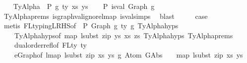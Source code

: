 \begin{isabellebody}
\isamarkupfalse%
\isanewline
\ \ \isamarkupfalse%
\ {\isacharparenleft}{\kern0pt}TyAlpha\ {\isasymGamma}{}\ P\ g\ ty\ xs\ ys{\isacharparenright}{\kern0pt}\isanewline
\ \ \isamarkupfalse%
\ P{}{\isacharcolon}{\kern0pt}\ {\isachardoublequoteopen}is{\isacharunderscore}{\kern0pt}val\ {\isacharparenleft}{\kern0pt}Graph\ g{\isacharparenright}{\kern0pt}{\isachardoublequoteclose}\isanewline
\ \ \ \ \isamarkupfalse%
\ TyAlpha{\isachardot}{\kern0pt}prems{\isacharparenleft}{\kern0pt}{}{\isacharparenright}{\kern0pt}\ is{\isacharunderscore}{\kern0pt}graph{\isacharunderscore}{\kern0pt}val{\isacharunderscore}{\kern0pt}ignore{\isacharunderscore}{\kern0pt}lmap\ is{\isacharunderscore}{\kern0pt}val{\isachardot}{\kern0pt}simps{\isacharparenleft}{\kern0pt}{}{\isacharparenright}{\kern0pt}\ \isamarkupfalse%
\ blast\isanewline
\ \ \isamarkupfalse%
\ \isamarkupfalse%
\ {\isacharquery}{\kern0pt}case\isanewline
\ \ \isamarkupfalse%
\ {\isacharparenleft}{\kern0pt}metis\ FL{\isacharunderscore}{\kern0pt}typing{\isacharunderscore}{\kern0pt}LRHS{\isacharbrackleft}{\kern0pt}of\ {\isasymGamma}{}\ P\ {\isachardoublequoteopen}Graph\ g{\isachardoublequoteclose}\ ty\ g{\isacharbrackright}{\kern0pt}\ TyAlpha{\isachardot}{\kern0pt}hyps{\isacharparenleft}{\kern0pt}{}{\isacharparenright}{\kern0pt}\isanewline
\ \ \ \ TyAlpha{\isachardot}{\kern0pt}hyps{\isacharparenleft}{\kern0pt}{}{\isacharparenright}{\kern0pt}{\isacharbrackleft}{\kern0pt}of\ {\isachardoublequoteopen}map\ {\isacharparenleft}{\kern0pt}lsubst\ {\isacharparenleft}{\kern0pt}zip\ ys\ xs{\isacharparenright}{\kern0pt}{\isacharparenright}{\kern0pt}\ zs{\isachardoublequoteclose}{\isacharbrackright}{\kern0pt}\ TyAlpha{\isachardot}{\kern0pt}hyps{\isacharparenleft}{\kern0pt}{}{\isacharcomma}{\kern0pt}{}{\isacharcomma}{\kern0pt}{}{\isacharcomma}{\kern0pt}{}{\isacharparenright}{\kern0pt}\ TyAlpha{\isachardot}{\kern0pt}prems{\isacharparenleft}{\kern0pt}{}{\isacharcomma}{\kern0pt}{}{\isacharparenright}{\kern0pt}\isanewline
\ \ \ \ dual{\isacharunderscore}{\kern0pt}order{\isachardot}{\kern0pt}refl{\isacharbrackleft}{\kern0pt}of\ {\isachardoublequoteopen}FLty\ ty{\isachardoublequoteclose}{\isacharbrackright}{\kern0pt}\isanewline
\ \ \ \ e{\isacharunderscore}{\kern0pt}Graph{\isacharbrackleft}{\kern0pt}of\ {\isachardoublequoteopen}lmap\ {\isacharparenleft}{\kern0pt}lsubst\ {\isacharparenleft}{\kern0pt}zip\ xs\ ys{\isacharparenright}{\kern0pt}{\isacharparenright}{\kern0pt}\ g{\isachardoublequoteclose}\ {\isachardoublequoteopen}Atom\ {\isacharparenleft}{\kern0pt}GAbs\ {\isacharunderscore}{\kern0pt}\ {\isacharunderscore}{\kern0pt}\ {\isacharunderscore}{\kern0pt}{\isacharparenright}{\kern0pt}\ {\isacharparenleft}{\kern0pt}map\ {\isacharparenleft}{\kern0pt}lsubst\ {\isacharparenleft}{\kern0pt}zip\ xs\ ys{\isacharparenright}{\kern0pt}{\isacharparenright}{\kern0pt}\ {\isacharunderscore}{\kern0pt}{\isacharparenright}{\kern0pt}{\isachardoublequoteclose}{\isacharbrackright}{\kern0pt}\isanewline

\end{isabellebody}
